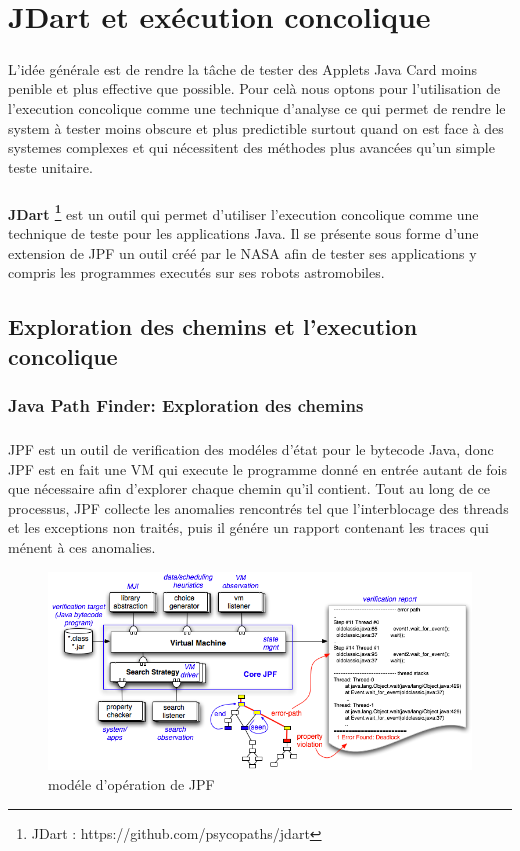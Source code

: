 \chapter{JDart et exécution concolique}
  \paragraph{}
    L'idée générale est de rendre la tâche de tester des Applets Java Card moins penible et plus effective que possible.
    Pour celà nous optons pour l'utilisation de l'execution concolique comme une technique d'analyse ce qui permet de rendre 
    le system à tester moins obscure et plus predictible surtout quand on est face à des systemes complexes
    et qui nécessitent des méthodes plus avancées qu'un simple teste unitaire.
  \paragraph{}
    \textbf{JDart \footnote{JDart : https://github.com/psycopaths/jdart}} est un outil qui permet d'utiliser l'execution concolique comme une technique de teste pour les applications Java.
    \newline
    Il se présente sous forme d'une extension de \gls{JPF} un outil créé par le NASA afin de tester ses applications y compris les programmes executés sur ses robots astromobiles.
  \section{Exploration des chemins et l'execution concolique}
    \subsection{Java Path Finder: Exploration des chemins}
      \nocite{JPF}
      \paragraph{}
	\gls{JPF} est un outil de verification des modéles d'état pour le bytecode Java,
	donc \gls{JPF} est en fait une \gls{VM} qui execute le programme donné en entrée autant de fois que nécessaire
	afin d'explorer chaque chemin qu'il contient.
	Tout au long de ce processus, \gls{JPF} collecte les anomalies rencontrés tel que l'interblocage des threads et les exceptions non traités,
	puis il génére un rapport contenant les traces qui ménent à ces anomalies.
	
	\begin{figure}[H]
	  \centering
	    \includegraphics[scale=0.5]{images/jpf-model.png}
	  \caption{modéle d'opération de \gls{JPF}}
	\end{figure}
